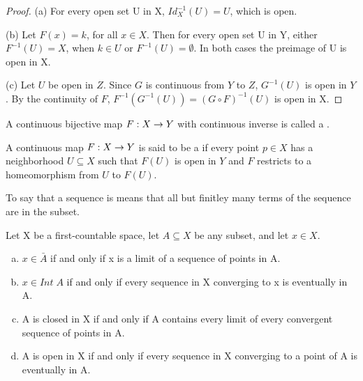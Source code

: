 \documentclass[11pt,a4paper]{article}
\begin{document}
\begin{proof}
    (a) For every open set U in X, $Id_X^{-1}(U) = U$, which is open.

    \noindent(b) Let $F(x)=k$, for all $x\in X$. Then for every open set U in Y, either $F^{-1}(U) = {X}$, when $k\in U$ or $F^{-1}(U)=\emptyset$. In both cases the preimage of U is open in X.

    \noindent(c) Let $U$ be open in $Z$. Since $G$ is continuous from $Y$ to $Z$, $G^{-1}(U)$ is open in $Y$. By the continuity of $F$, $F^{-1}(G^{-1}(U)) = (G\circ F)^{-1}(U)$ is open in X.
\end{proof}

\begin{definition}
    A continuous bijective map $F:X\rightarrow Y$ with continuous inverse is called a .
\end{definition}

\begin{definition}\label{def:local_homeormorphism}
    A continuous map $F:X\rightarrow Y$ is said to be a  if every point $p\in X$ has a neighborhood $U\subseteq X$ such that $F(U)$ is open in $Y$ and $F$ restricts to a homeomorphism from $U$ to $F(U)$.
\end{definition}

To say that a sequence is  means that all but finitley many terms of the sequence are in the subset.

\begin{proposition}\label{prop:seq_lemma}
    Let X be a first-countable space, let $A\subseteq X$ be any subset, and let $x\in X$.
    \begin{enumerate}[(a)]
        \item $x\in \bar{A}$ if and only if x is a limit of a sequence of points in A.
        \item $x\in Int\;A$ if and only if every sequence in X converging to x is eventually in A.
        \item A is closed in X if and only if A contains every limit of every convergent sequence of points in A.
        \item A is open in X if and only if every sequence in X converging to a point of A is eventually in A. 
    \end{enumerate}
\end{proposition}
\end{document}
